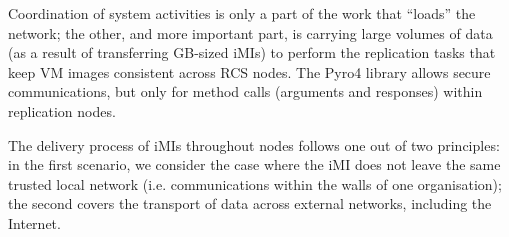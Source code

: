 



Coordination of system activities is only a part of the work that “loads” the network; the other, and more important part, is carrying large volumes of data (as a result of transferring GB-sized iMIs) to perform the replication tasks that keep VM images consistent across RCS nodes. The Pyro4 library allows secure communications, but only for method calls (arguments and responses) within replication nodes.

The delivery process of iMIs throughout nodes follows one out of two principles: in the first scenario, we consider the case where the iMI does not leave the same trusted local network (i.e. communications within the walls of one organisation); the second covers the transport of data across external networks, including the Internet.

